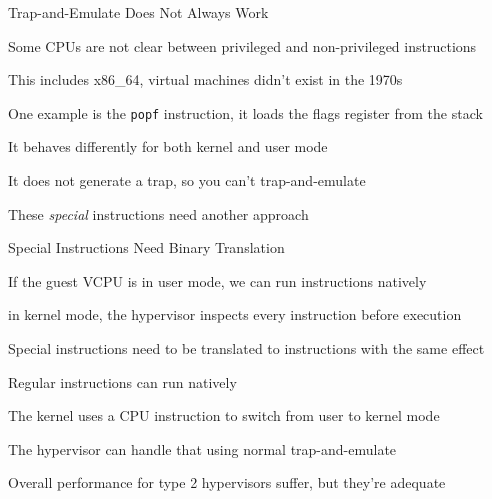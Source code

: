   \begin{frame}{Trap-and-Emulate Does Not Always Work}

     Some CPUs are not clear between privileged and non-privileged instructions

     \hspace{2em} This includes x86\_64, virtual machines didn't exist in the 1970s

     \vspace{2em}

     One example is the \texttt{popf} instruction, it loads the flags register
     from the stack

     \hspace{2em} It behaves differently for both kernel and user mode

     \vspace{2em}

     It does not generate a trap, so you can't trap-and-emulate

     \hspace{2em} These \textit{special} instructions need another approach
  \end{frame}

  \begin{frame}{Special Instructions Need Binary Translation}

    If the guest VCPU is in user mode, we can run instructions natively

    \hspace{2em} in kernel mode, the hypervisor inspects every instruction
                 before execution

    \vspace{2em}

    Special instructions need to be translated to instructions with the same
    effect

    \hspace{2em} Regular instructions can run natively

    \vspace{2em}

    The kernel uses a CPU instruction to switch from user to kernel mode

    \hspace{2em} The hypervisor can handle that using normal trap-and-emulate

    \vspace{2em}

    Overall performance for type 2 hypervisors suffer, but they're adequate
  \end{frame}

